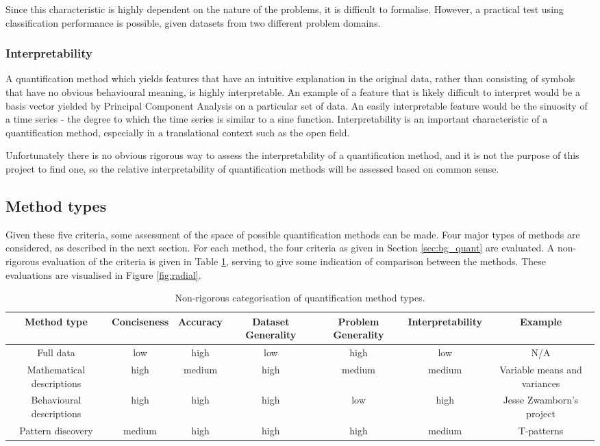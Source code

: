 \documentclass[conference,a4paper,twoside]{IEEEtran}
\begin{document}
Since this characteristic is highly dependent on the nature of the problems, it is difficult to formalise. However, a practical test using classification performance is possible, given datasets from two different problem domains.

\subsubsection{Interpretability}
A quantification method which yields features that have an intuitive explanation in the original data, rather than consisting of symbols that have no obvious behavioural meaning, is highly interpretable. An example of a feature that is likely difficult to interpret would be a basis vector yielded by Principal Component Analysis \cite{wold1987principal} on a particular set of data. An easily interpretable feature would be the sinuosity of a time series - the degree to which the time series is similar to a sine function. Interpretability is an important characteristic of a quantification method, especially in a translational context such as the open field.

Unfortunately there is no obvious rigorous way to assess the interpretability of a quantification method, and it is not the purpose of this project to find one, so the relative interpretability of quantification methods will be assessed based on common sense.

\subsection{Method types}
Given these five criteria, some assessment of the space of possible quantification methods can be made. Four major types of methods are considered, as described in the next section. For each method, the four criteria as given in Section \ref{sec:bg_quant} are evaluated. A non-rigorous evaluation of the criteria is given in Table \ref{tab:feature_extraction_methods}, serving to give some indication of comparison between the methods. These evaluations are visualised in Figure \ref{fig:radial}.

\begin{table}
    \centering
    \caption{Non-rigorous categorisation of quantification method types. }
    \begin{tabular}{ccccccc}
        Method type & Conciseness & Accuracy & Dataset Generality & Problem Generality & Interpretability & Example \\\hline
        Full data & low & high & low & high & low & N/A \\
        Mathematical descriptions & high & medium & high & medium & medium & Variable means and variances \\
        Behavioural descriptions & high & high & high & low & high & Jesse Zwamborn's project \cite{jesse} \\
        Pattern discovery & medium & high & high & high & medium & T-patterns \\
    \end{tabular}
    \label{tab:feature_extraction_methods}
\end{table}
\end{document}

